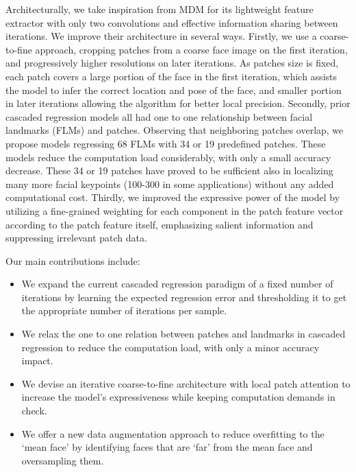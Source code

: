 \documentclass[twocolumn]{article}
\begin{document}
Architecturally, we take inspiration from MDM \cite{trigeorgis2016mnemonic} for its lightweight feature extractor with only two convolutions and effective information sharing between iterations. We improve their architecture in several ways. Firstly, we use a coarse-to-fine approach, cropping patches from a coarse face image on the first iteration, and progressively higher resolutions on later iterations. As patches size is fixed, each patch covers a large portion of the face in the first iteration, which assists the model to infer the correct location and pose of the face, and smaller portion in later iterations allowing the algorithm for better local precision. Secondly, prior cascaded regression models all had one to one relationship between facial landmarks (FLMs) and patches. Observing that neighboring patches overlap, we propose models regressing 68 FLMs with 34 or 19 predefined patches. These models reduce the computation load considerably, with only a small accuracy decrease. These 34 or 19 patches have proved to be sufficient also in localizing many more facial keypoints (100-300 in some applications) without any added computational cost. Thirdly, we improved the expressive power of the model by utilizing a fine-grained weighting for each component in the patch feature vector according to the patch feature itself, emphasizing salient information and suppressing irrelevant patch data. 


Our main contributions include:
\begin{itemize}

    \item We expand the current cascaded regression paradigm of a fixed number of iterations by learning the expected regression error and thresholding it to get the appropriate number of iterations per sample.
    
    \item We relax the one to one relation between patches and landmarks in cascaded regression to reduce the computation load, with only a minor accuracy impact.
    
    \item We devise an iterative coarse-to-fine architecture with local patch attention to increase the model’s expressiveness while keeping computation demands in check.
    
    \item We offer a new data augmentation approach to reduce overfitting to the ‘mean face’ by identifying faces that are ‘far’ from the mean face and oversampling them. 
\end{itemize}
\end{document}
